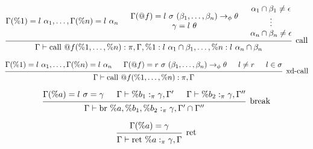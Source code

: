 \documentclass{article}
\begin{document}
\[
\begin{prooftree}
    \hypo{\Gamma(\%1) = l\ \alpha_1, \dots, \Gamma(\%n) = l\ \alpha_n}
    \hypo{
        \begin{matrix}
            \Gamma(@f) = l\ \sigma\ (\beta_1, \dots, \beta_n) \rightarrow_\phi \theta \\
            \gamma = l\ \theta 
        \end{matrix}}
    \hypo{
        \begin{matrix}
        \alpha_1 \cap \beta_1 \neq \epsilon \\
        \vdots \\
        \alpha_n \cap \beta_n \neq \epsilon
        \end{matrix}
    }
    \infer3[call]{\Gamma \vdash \text{call } @f(\%1, \dots, \%n) : \pi, \Gamma, \%1: l\ \alpha_1 \cap \beta_1, \dots, \%n: l\ \alpha_n \cap \beta_n}
\end{prooftree}
\]

\[
\begin{prooftree}
    \hypo{\Gamma(\%1) = l\ \alpha_1, \dots, \Gamma(\%n) = l\ \alpha_n}
    \hypo{\Gamma(@f) = r\ \sigma\ (\beta_1, \dots, \beta_n) \rightarrow_\phi \theta}
    \hypo{l \neq r}
    \hypo{l \in \sigma}
    \infer4[xd-call]{\Gamma \vdash \text{call } @f(\%1, \dots, \%n) : \pi, \Gamma}
\end{prooftree}
\]

\[
\begin{prooftree}
    \hypo{\Gamma(\%a) = l\ \sigma = \gamma}
    \hypo{\Gamma \vdash \%b_1 :_\pi \gamma, \Gamma'} 
    \hypo{\Gamma \vdash \%b_2 :_\pi \gamma, \Gamma''} 
    \infer3[break]{\Gamma \vdash \text{br }\%a, \%b_1, \%b_2 :_\pi \gamma, \Gamma' \cap \Gamma''}
\end{prooftree}
\]

\[
\begin{prooftree}
    \hypo{\Gamma(\%a) = \gamma}
    \infer1[ret]{\Gamma \vdash \text{ret }\%a :_\pi \gamma, \Gamma}
\end{prooftree}
\]
\end{document}
